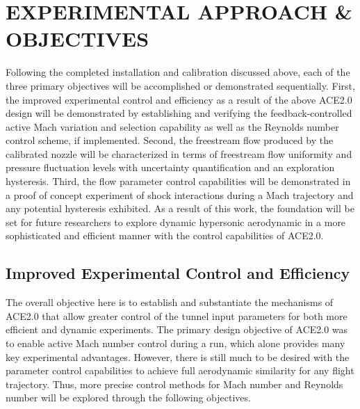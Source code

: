 %
%  
%


\chapter{EXPERIMENTAL APPROACH \& OBJECTIVES}

Following the completed installation and calibration discussed above, each of the three primary objectives will be accomplished or demonstrated sequentially. First, the improved experimental control and efficiency as a result of the above ACE2.0 design will be demonstrated by establishing and verifying the feedback-controlled active Mach variation and selection capability as well as the Reynolds number control scheme, if implemented. Second, the freestream flow produced by the calibrated nozzle will be characterized in terms of freestream flow uniformity and pressure fluctuation levels with uncertainty quantification and an exploration hysteresis. Third, the flow parameter control capabilities will be demonstrated in a proof of concept experiment of shock interactions during a Mach trajectory and any potential hysteresis exhibited. As a result of this work, the foundation will be set for future researchers to explore dynamic hypersonic aerodynamic in a more sophisticated and efficient manner with the control capabilities of ACE2.0.

\section{Improved Experimental Control and Efficiency} 

The overall objective here is to establish and substantiate the mechanisms of ACE2.0 that allow greater control of the tunnel input parameters for both more efficient and dynamic experiments. The primary design objective of ACE2.0 was to enable active Mach number control during a run, which alone provides many key experimental advantages. However, there is still much to be desired with the parameter control capabilities to achieve full aerodynamic similarity for any flight trajectory. Thus, more precise control methods for Mach number and Reynolds number will be explored through the following objectives.

